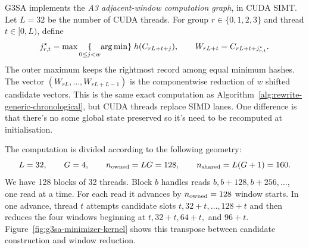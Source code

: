 G3SA implements the \emph{A3 adjacent-window computation graph}, in CUDA
SIMT. Let $L=32$ be the number of CUDA threads.  For group $r\in\{0,1,2,3\}$ and thread $t\in[0,L)$, define
\[
  j^\star_{r,t}
    = \max\underset{0\leq j<w}\{{\arg\min}\}\;
        h(C_{rL+t+j}),
  \qquad
  W_{rL+t}=C_{rL+t+j^\star_{r,t}} .
\]
The outer maximum keeps the rightmost record among equal minimum hashes.  The
vector $(W_{rL},\ldots,W_{rL+L-1})$ is the componentwise reduction of $w$
shifted candidate vectors.  This is the same exact computation as
Algorithm~\ref{alg:rewrite-generic-chronological}, but CUDA threads replace SIMD
lanes. One difference is that there's no some global state preserved so it's need to be recomputed at initialisation.

The computation is divided according to the following geometry:
\[
  L=32,\qquad G=4,\qquad
  n_{\rm owned}=LG=128,\qquad n_{\rm shared}=L(G+1)=160.
\]
We have 128 blocks of 32 threads.  Block $b$ handles reads
$b,b+128,b+256,\ldots$, one read at a time.  For each read it advances by
$n_{\rm owned}=128$ window starts.  In one advance, thread $t$ attempts
candidate slots $t,32+t,\ldots,128+t$ and then reduces the four windows
beginning at
$t,32+t,64+t,$ and $96+t$.  Figure~\ref{fig:g3sa-minimizer-kernel} shows this
transpose between candidate construction and window reduction.

